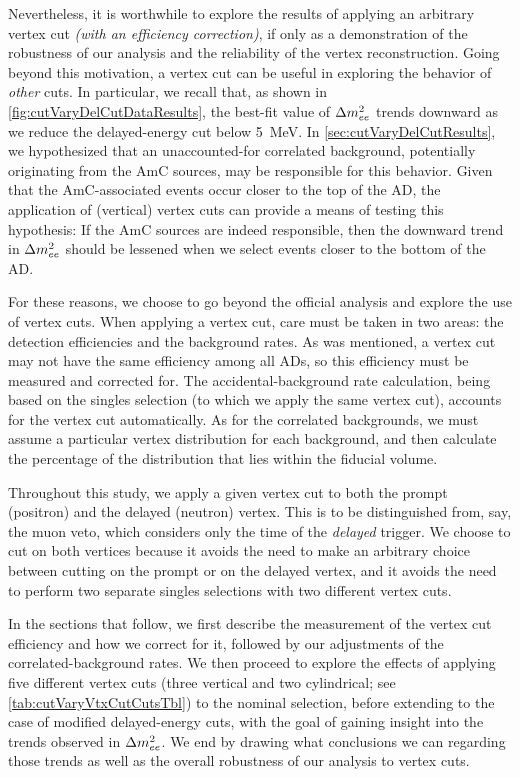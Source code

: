 \documentclass[../thesis.tex]{subfiles}
\begin{document}
Nevertheless, it is worthwhile to explore the results of applying an arbitrary vertex cut \emph{(with an efficiency correction)}, if only as a demonstration of the robustness of our analysis and the reliability of the vertex reconstruction. Going beyond this motivation, a vertex cut can be useful in exploring the behavior of \emph{other} cuts. In particular, we recall that, as shown in \autoref{fig:cutVaryDelCutDataResults}, the best-fit value of $\Delta m^2_{ee}$ trends downward as we reduce the delayed-energy cut below 5~MeV. In \autoref{sec:cutVaryDelCutResults}, we hypothesized that an unaccounted-for correlated background, potentially originating from the AmC sources, may be responsible for this behavior. Given that the AmC-associated events occur closer to the top of the AD, the application of (vertical) vertex cuts can provide a means of testing this hypothesis: If the AmC sources are indeed responsible, then the downward trend in $\Delta m^2_{ee}$ should be lessened when we select events closer to the bottom of the AD\@.

For these reasons, we choose to go beyond the official analysis and explore the use of vertex cuts. When applying a vertex cut, care must be taken in two areas: the detection efficiencies and the background rates. As was mentioned, a vertex cut may not have the same efficiency among all ADs, so this efficiency must be measured and corrected for. The accidental-background rate calculation, being based on the singles selection (to which we apply the same vertex cut), accounts for the vertex cut automatically. As for the correlated backgrounds, we must assume a particular vertex distribution for each background, and then calculate the percentage of the distribution that lies within the fiducial volume.

Throughout this study, we apply a given vertex cut to both the prompt (positron) and the delayed (neutron) vertex. This is to be distinguished from, say, the muon veto, which considers only the time of the \emph{delayed} trigger. We choose to cut on both vertices because it avoids the need to make an arbitrary choice between cutting on the prompt or on the delayed vertex, and it avoids the need to perform two separate singles selections with two different vertex cuts.

In the sections that follow, we first describe the measurement of the vertex cut efficiency and how we correct for it, followed by our adjustments of the correlated-background rates. We then proceed to explore the effects of applying five different vertex cuts (three vertical and two cylindrical; see \autoref{tab:cutVaryVtxCutCutsTbl}) to the nominal selection, before extending to the case of modified delayed-energy cuts, with the goal of gaining insight into the trends observed in $\Delta m^2_{ee}$. We end by drawing what conclusions we can regarding those trends as well as the overall robustness of our analysis to vertex cuts.
\end{document}
